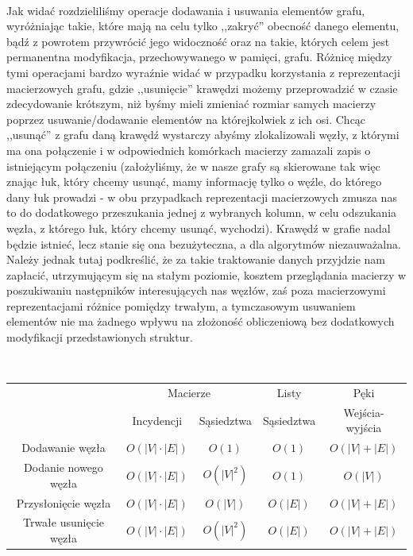 ~

Jak widać rozdzieliliśmy operacje dodawania i usuwania elementów grafu, wyróżniając takie, które mają na celu tylko ,,zakryć'' obecność danego elementu, bądź z powrotem przywrócić jego widoczność oraz na takie, których celem jest permanentna modyfikacja, przechowywanego w pamięci, grafu. Różnicę między tymi operacjami bardzo wyraźnie widać w przypadku korzystania z reprezentacji macierzowych grafu, gdzie ,,usunięcie'' krawędzi możemy przeprowadzić w czasie zdecydowanie krótszym, niż byśmy mieli zmieniać rozmiar samych macierzy poprzez usuwanie/dodawanie elementów na którejkolwiek z ich osi. Chcąc ,,usunąć'' z grafu daną krawędź wystarczy abyśmy zlokalizowali węzły, z którymi ma ona połączenie i w odpowiednich komórkach macierzy zamazali zapis o istniejącym połączeniu (założyliśmy, że w nasze grafy są skierowane tak więc znając łuk, który chcemy usunąć, mamy informację tylko o węźle, do którego dany łuk prowadzi - w obu przypadkach reprezentacji macierzowych zmusza nas to do dodatkowego przeszukania jednej z wybranych kolumn, w celu odszukania węzła, z którego łuk, który chcemy usunąć, wychodzi). Krawędź w grafie nadal będzie istnieć, lecz stanie się ona bezużyteczna, a dla algorytmów niezauważalna. Należy jednak tutaj podkreślić, że za takie traktowanie danych przyjdzie nam zapłacić, utrzymującym się na stałym poziomie, kosztem przeglądania macierzy w poszukiwaniu następników interesujących nas węzłów, zaś poza macierzowymi reprezentacjami różnice pomiędzy trwałym, a tymczasowym usuwaniem elementów nie ma żadnego wpływu na złożoność obliczeniową bez dodatkowych modyfikacji przedstawionych struktur.

~
\begin{center}
	\begin{tabular}{ccccc}
		\hline
		& \multicolumn{2}{c}{Macierze} & \multicolumn{1}{c}{Listy} & \multicolumn{1}{c}{Pęki} \\
		& Incydencji & Sąsiedztwa & Sąsiedztwa & Wejścia-wyjścia \\
		\hline
		Dodawanie węzła & $ O \left( \left| V \right| \cdot \left| E \right| \right) $ & $ O \left( 1 \right) $ & $O \left( 1 \right) $ & $O \left( \left| V \right| + \left| E \right| \right) $ \\
		Dodanie nowego  węzła & $ O \left( \left| V \right| \cdot \left| E \right| \right) $  & $ O \left( \left| V \right| ^{2} \right)$ & $ O \left( 1 \right)$ & $ O \left( \left| V \right| \right)$ \\
		Przysłonięcie węzła & $ O \left( \left| V \right| \cdot \left| E \right| \right) $  & $ O \left( \left| V \right| \right)$ & $ O \left( \left| E \right| \right)$ & $ O \left( \left| V \right| + \left| E \right| \right)$ \\
		Trwałe usunięcie węzła & $ O \left( \left| V \right| \cdot \left| E \right| \right) $  & $ O \left( \left| V \right| ^{2} \right)$ & $ O \left( \left| E \right| \right)$ & $ O \left( \left| V \right| + \left| E \right| \right)$ \\
	\end{tabular}
\end{center}

